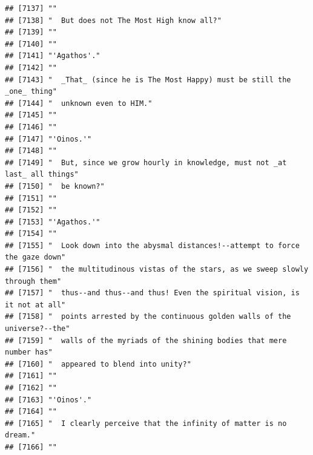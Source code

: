 \documentclass{article}\usepackage[]{graphicx}\usepackage[]{color}
\makeatletter
\newenvironment{kframe}{%
 \def\at@end@of@kframe{}%
 \ifinner\ifhmode%
  \def\at@end@of@kframe{\end{minipage}}%
  \begin{minipage}{\columnwidth}%
 \fi\fi%
 \def\FrameCommand##1{\hskip\@totalleftmargin \hskip-\fboxsep
 \colorbox{shadecolor}{##1}\hskip-\fboxsep
     \hskip-\linewidth \hskip-\@totalleftmargin \hskip\columnwidth}%
 \MakeFramed {\advance\hsize-\width
   \@totalleftmargin\z@ \linewidth\hsize
   \@setminipage}}%
 {\par\unskip\endMakeFramed%
 \at@end@of@kframe}
\newenvironment{knitrout}{}{} %
\makeatother
\begin{document}
\begin{knitrout}
\begin{kframe}
\begin{verbatim}
## [7137] ""                                                                            
## [7138] "  But does not The Most High know all?"                                      
## [7139] ""                                                                            
## [7140] ""                                                                            
## [7141] "'Agathos'."                                                                  
## [7142] ""                                                                            
## [7143] "  _That_ (since he is The Most Happy) must be still the _one_ thing"         
## [7144] "  unknown even to HIM."                                                      
## [7145] ""                                                                            
## [7146] ""                                                                            
## [7147] "'Oinos.'"                                                                    
## [7148] ""                                                                            
## [7149] "  But, since we grow hourly in knowledge, must not _at last_ all things"     
## [7150] "  be known?"                                                                 
## [7151] ""                                                                            
## [7152] ""                                                                            
## [7153] "'Agathos.'"                                                                  
## [7154] ""                                                                            
## [7155] "  Look down into the abysmal distances!--attempt to force the gaze down"     
## [7156] "  the multitudinous vistas of the stars, as we sweep slowly through them"    
## [7157] "  thus--and thus--and thus! Even the spiritual vision, is it not at all"     
## [7158] "  points arrested by the continuous golden walls of the universe?--the"      
## [7159] "  walls of the myriads of the shining bodies that mere number has"           
## [7160] "  appeared to blend into unity?"                                             
## [7161] ""                                                                            
## [7162] ""                                                                            
## [7163] "'Oinos'."                                                                    
## [7164] ""                                                                            
## [7165] "  I clearly perceive that the infinity of matter is no dream."               
## [7166] ""                                                                            

\end{verbatim}
\end{kframe}
\end{knitrout}
\end{document}
